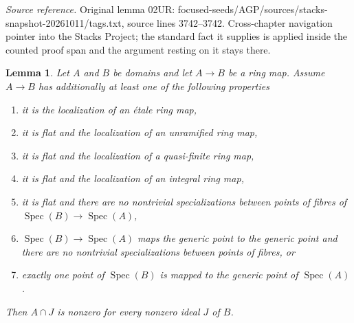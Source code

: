 \documentclass[10pt,a4paper]{amsart}
\theoremstyle{plain}
\newtheorem{lemma}[subsection]{Lemma}
\theoremstyle{definition}
\theoremstyle{remark}
\numberwithin{equation}{subsection}
\def\Spec{\mathop{\mathrm{Spec}}}
\begin{document}
\noindent\textit{Source reference.} Original lemma 02UR: focused-seeds/AGP/sources/stacks-snapshot-20261011/tags.txt, source lines 3742--3742. Cross-chapter navigation pointer into the Stacks Project; the standard fact it supplies is applied inside the counted proof span and the argument resting on it stays there.\par\medskip
\begin{lemma}
\label{lemma-ideal-inverse-nonzero}
Let $A$ and $B$ be domains and let $A \to B$ be a ring map.
Assume $A \to B$ has additionally at least one of the following properties
\begin{enumerate}
\item it is the localization of an \'etale ring map,
\item it is flat and the localization of an unramified ring map,
\item it is flat and the localization of a quasi-finite ring map,
\item it is flat and the localization of an integral ring map,
\item it is flat and there are no nontrivial specializations between points
of fibres of $\Spec(B) \to \Spec(A)$,
\item $\Spec(B) \to \Spec(A)$ maps the generic point to the generic
point and there are no nontrivial specializations between points of fibres, or
\item exactly one point of $\Spec(B)$ is mapped to the generic
point of $\Spec(A)$.
\end{enumerate}
Then $A \cap J$ is nonzero for every nonzero ideal $J$ of $B$.
\end{lemma}
\end{document}
